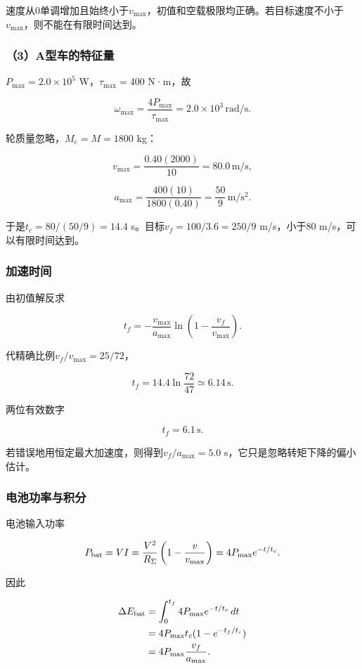\documentclass[12pt,a4paper,fontset=fandol]{ctexart}
\begin{document}
速度从0单调增加且始终小于\(v_{\max}\)，初值和空载极限均正确。若目标速度不小于\(v_{\max}\)，则不能在有限时间达到。

\subsubsection{（3）A型车的特征量}\label{aux578bux8f66ux7684ux7279ux5f81ux91cf}

\(P_{\max}=2.0\times10^5\) W，\(\tau_{\max}=400\) N·m，故

\[
\omega_{\max}=\frac{4P_{\max}}{\tau_{\max}}
=2.0\times10^3\,\mathrm{rad/s}.
\]

轮质量忽略，\(M_e=M=1800\) kg：

\[
v_{\max}=\frac{0.40(2000)}{10}
=80.0\,\mathrm{m/s},
\]

\[
a_{\max}=\frac{400(10)}{1800(0.40)}
=\frac{50}{9}\,\mathrm{m/s^2}.
\]

于是\(t_c=80/(50/9)=14.4\) s。目标\(v_f=100/3.6=250/9\) m/s，小于80
m/s，可以有限时间达到。

\subsubsection{加速时间}\label{ux52a0ux901fux65f6ux95f4}

由初值解反求

\[
t_f=-\frac{v_{\max}}{a_{\max}}
\ln\left(1-\frac{v_f}{v_{\max}}\right).
\]

代精确比例\(v_f/v_{\max}=25/72\)，

\[
t_f=14.4\ln\frac{72}{47}\simeq6.14\,\mathrm s.
\]

两位有效数字

\[
\boxed{t_f=6.1\,\mathrm s}.
\]

若错误地用恒定最大加速度，则得到\(v_f/a_{\max}=5.0\)
s，它只是忽略转矩下降的偏小估计。

\subsubsection{电池功率与积分}\label{ux7535ux6c60ux529fux7387ux4e0eux79efux5206}

电池输入功率

\[
P_{\rm bat}=VI=\frac{V^2}{R_\Sigma}
\left(1-\frac v{v_{\max}}\right)
=4P_{\max}e^{-t/t_c}.
\]

因此

\[
\begin{aligned}
\Delta E_{\rm bat}
&=\int_0^{t_f}4P_{\max}e^{-t/t_c}\,dt\\
&=4P_{\max}t_c(1-e^{-t_f/t_c})\\
&=4P_{\max}\frac{v_f}{a_{\max}}.
\end{aligned}
\]
\end{document}

